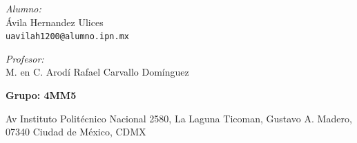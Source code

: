 \begin{center}
\begin{minipage}{0.46\textwidth}
\begin{flushleft} \large
\emph{Alumno:}\\
\'Avila Hernandez Ulices\\
\texttt{uavilah1200@alumno.ipn.mx}\\
\end{flushleft}
\end{minipage}
\begin{minipage}{0.52\textwidth}
\vspace{-0.6cm}
\begin{flushright} \large
\emph{Profesor:} \\
M. en C. Arodí Rafael Carvallo Domínguez\\


\end{flushright}
\end{minipage}	
\vspace*{1cm}


\textbf{\Large Grupo: 4MM5}\\
\vspace{2cm}
\begin{center}
Av Instituto Politécnico Nacional 2580, La Laguna Ticoman, Gustavo A. Madero, 07340 Ciudad de México, CDMX
\end{center}
\end{center}